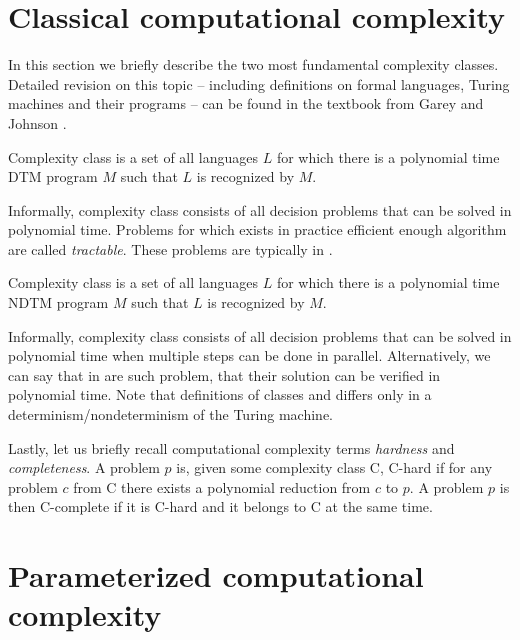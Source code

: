\section{Classical computational complexity}

In this section we briefly describe the two most fundamental complexity classes.
Detailed revision on this topic --
including definitions on formal languages, Turing machines and their programs --
can be found in the textbook from Garey and Johnson \cite{Garey1990}. 

\begin{definition}[\Po]
    Complexity class \Po is a set of all languages $L$ for which there is a polynomial time DTM program $M$
    such that $L$ is recognized by $M$.
\end{definition}
Informally, complexity class \Po consists of all decision problems that can be solved in polynomial time.
Problems for which exists in practice efficient enough algorithm are called \emph{tractable}.
These problems are typically in \Po.

\begin{definition}[\NP]
    Complexity class \NP is a set of all languages $L$ for which there is a polynomial time NDTM program $M$
    such that $L$ is recognized by $M$.
\end{definition}
Informally, complexity class \NP consists of all decision problems that can be solved in polynomial time
when multiple steps can be done in parallel.
Alternatively, we can say that in \NP are such problem, that their solution can be verified in polynomial time.
Note that definitions of classes \Po and \NP differs only in a determinism/nondeterminism of the Turing machine.

Lastly, let us briefly recall computational complexity terms \emph{hardness} and \emph{completeness}.
A problem $p$ is, given some complexity class \textsf{C}, \textsf{C-hard} if for any problem $c$ from \textsf{C}
there exists a polynomial reduction from $c$ to $p$.
A problem $p$ is then \textsf{C-complete} if it is \textsf{C-hard} and it belongs to \textsf{C} at the same time.


\section{Parameterized computational complexity}\label{section:ParamComp}

